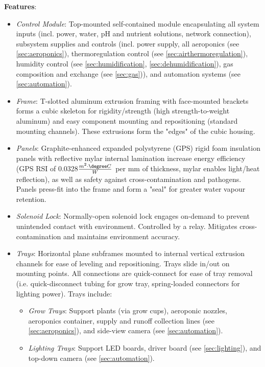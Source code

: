 \textbf{Features}:
\begin{itemize}
    \item \textit{Control Module}: Top-mounted self-contained module encapsulating all system inputs (incl. power, water, pH and nutrient solutions, network connection), subsystem supplies and controls (incl. power supply, all aeroponics (see \ref{sec:aeroponics}), thermoregulation control (see \ref{sec:airthermoregulation}), humidity control (see \ref{sec:humidification}, \ref{sec:dehumidification}), gas composition and exchange (see \ref{sec:gas})), and automation systems (see \ref{sec:automation}).
    \item \textit{Frame}: T-slotted aluminum extrusion framing with face-mounted brackets forms a cubic skeleton for rigidity/strength (high strength-to-weight aluminum) and easy component mounting and repositioning (standard mounting channels). These extrusions form the "edges" of the cubic housing. %
    \item \textit{Panels}: Graphite-enhanced expanded polystyrene (GPS) rigid foam insulation panels \cite{insulation} with reflective mylar internal lamination increase energy efficiency (GPS RSI of 0.0328$\frac{m^2 \cdot \degree C}{W}$ per mm of thickness, mylar enables light/heat reflection), as well as safety against cross-contamination and pathogens. Panels press-fit into the frame and form a "seal" for greater water vapour retention. %
    \item \textit{Solenoid Lock}: Normally-open solenoid lock engages on-demand to prevent unintended contact with environment. Controlled by a relay. Mitigates cross-contamination and maintains environment accuracy.
    \item \textit{Trays}: Horizontal plane subframes mounted to internal vertical extrusion channels for ease of leveling and repositioning. Trays slide in/out on mounting points. All connections are quick-connect for ease of tray removal (i.e. quick-disconnect tubing for grow tray, spring-loaded connectors for lighting power). Trays include:
    \begin{itemize}
        \item \textit{Grow Trays}: Support plants (via grow cups), aeroponic nozzles, aeroponics container, supply and runoff collection lines (see \ref{sec:aeroponics}), and side-view camera (see \ref{sec:automation}).
        \item \textit{Lighting Trays}: Support LED boards, driver board (see \ref{sec:lighting}), and top-down camera (see \ref{sec:automation}).
    \end{itemize}
\end{itemize}

